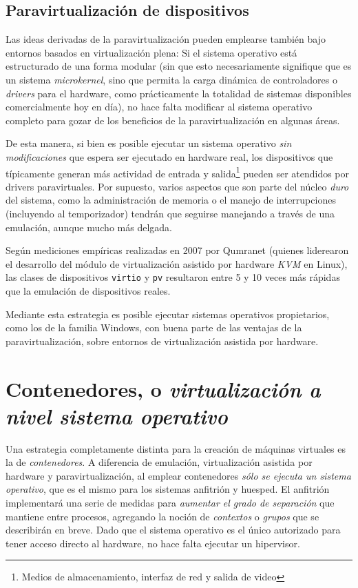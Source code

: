 \documentclass[11pt,fleqn]{book} %
\begin{document}
\subsection{Paravirtualización de dispositivos}
\label{sec-9-4-2}


Las ideas derivadas de la paravirtualización pueden emplearse también
bajo entornos basados en virtualización plena: Si el sistema operativo
está estructurado de una forma modular (sin que esto necesariamente
signifique que es un sistema \emph{microkernel}, sino que permita la carga
dinámica de controladores o \emph{drivers} para el hardware, como
prácticamente la totalidad de sistemas disponibles comercialmente hoy
en día), no hace falta modificar al sistema operativo completo para
gozar de los beneficios de la paravirtualización en algunas áreas.

De esta manera, si bien es posible ejecutar un sistema operativo \emph{sin modificaciones} que espera ser ejecutado en hardware real, los
dispositivos que típicamente generan más actividad de entrada y
salida\footnote{Medios de almacenamiento, interfaz de red y salida de
video } pueden ser atendidos por drivers paravirtuales. Por supuesto, varios
aspectos que son parte del núcleo \emph{duro} del sistema, como la
administración de memoria o el manejo de interrupciones (incluyendo al
temporizador) tendrán que seguirse manejando a través de una
emulación, aunque mucho más delgada.

Según mediciones empíricas realizadas en 2007 por Qumranet (quienes
liderearon el desarrollo del módulo de virtualización asistido por
hardware \emph{KVM} en Linux), las clases de dispositivos \texttt{virtio} y \texttt{pv}
resultaron entre 5 y 10 veces más rápidas que la emulación de
dispositivos reales.

Mediante esta estrategia es posible ejecutar sistemas operativos
propietarios, como los de la familia Windows, con buena parte de las
ventajas de la paravirtualización, sobre entornos de virtualización
asistida por hardware.
\section{Contenedores, o \emph{virtualización a nivel sistema operativo}}
\label{sec-9-5}
\label{VIRT_contenedores}


Una estrategia completamente distinta para la creación de máquinas
virtuales es la de \emph{contenedores}. A diferencia de emulación,
virtualización asistida por hardware y paravirtualización, al emplear
contenedores \emph{sólo se ejecuta un sistema operativo}, que es el mismo
para los sistemas anfitrión y huesped. El anfitrión implementará una
serie de medidas para \emph{aumentar el grado de separación} que mantiene
entre procesos, agregando la noción de \emph{contextos} o \emph{grupos} que
se describirán en breve. Dado que el sistema operativo es el
único autorizado para tener acceso directo al hardware, no hace falta
ejecutar un hipervisor.
\end{document}
